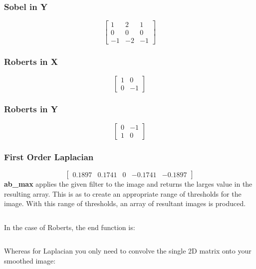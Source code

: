 \documentclass{Resources/UoBLab1}
\begin{document}
\subsubsection{Sobel in Y}
\[
\begin{bmatrix}
    1 & 2 & 1\\
    0 & 0 & 0\\
    -1 & -2 & -1
\end{bmatrix}
\]
\subsubsection{Roberts in X}
\[
\begin{bmatrix}
    1 & 0\\
    0 & -1
\end{bmatrix}
\]
\subsubsection{Roberts in Y}
\[
\begin{bmatrix}
    0 & -1\\
    1 & 0
\end{bmatrix}
\]
\subsubsection{First Order Laplacian}
\[
\begin{bmatrix}
    0.1897 & 0.1741 & 0 & -0.1741 & -0.1897
\end{bmatrix}
\]
\clearpage
\textbf{ab\_max} applies the given filter to the image and returns the larges value in the resulting array. This is as to create an appropriate range of thresholds for the image. With this range of thresholds, an array of resultant images is produced.

\inputminted[fontsize=\scriptsize]{octave}{Resources/code/filterxy.m}

In the case of Roberts, the end function is:\\


\inputminted[fontsize=\scriptsize]{octave}{Resources/code/roberts.m}



Whereas for Laplacian you only need to convolve the single 2D matrix onto your smoothed image: 

\inputminted[fontsize=\scriptsize]{octave}{Resources/code/lap.m}
\end{document}
